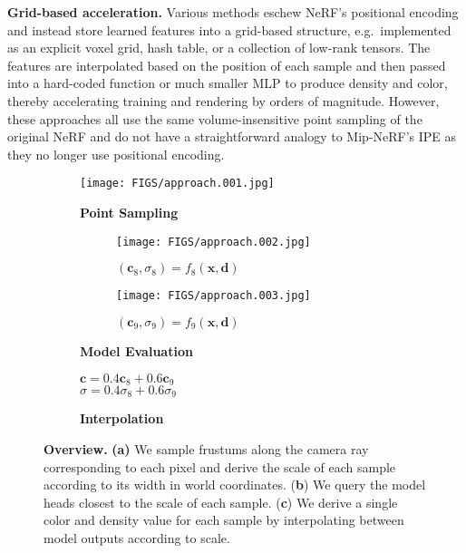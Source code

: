 \documentclass{article}
\begin{document}
\textbf{Grid-based acceleration.} Various methods \cite{yu_and_fridovichkeil2021plenoxels, mueller2022instant, SunSC22, Chen2022ECCV, kplanes_2023} eschew NeRF's positional encoding and instead store learned features into a grid-based structure, e.g.\ implemented as an explicit voxel grid, hash table, or a collection of low-rank tensors. The features are interpolated based on the position of each sample and then passed into a hard-coded function or much smaller MLP to produce density and color, thereby accelerating training and rendering by orders of magnitude. However, these approaches all use the same volume-insensitive point sampling of the original NeRF and do not have a straightforward analogy to Mip-NeRF's IPE as they no longer use positional encoding.

\begin{figure*}[t!]
  \centering
  \begin{subfigure}[ht]{0.55\textwidth}
    \centering
    \texttt{[image: FIGS/approach.001.jpg]}
    \vspace*{0.3mm}
    \caption{\textbf{Point Sampling}}
  \end{subfigure}
  \begin{subfigure}[ht]{0.2\textwidth}
  \vspace*{1.5mm}
    \begin{subfigure}{\textwidth}
      \centering
      \texttt{[image: FIGS/approach.002.jpg]}
    \caption*{$(\mathbf{c}_8, \sigma_8) = f_8(\mathbf{x}, \mathbf{d})$}
    \end{subfigure}
    \begin{subfigure}{\textwidth}
      \centering
      \texttt{[image: FIGS/approach.003.jpg]}
    \caption*{$(\mathbf{c}_9, \sigma_9) = f_9(\mathbf{x}, \mathbf{d})$}
    \end{subfigure}
    \caption{\textbf{Model Evaluation}}
    \label{fig:flat}
  \end{subfigure}
  \hspace*{3mm}
  \begin{subfigure}[ht]{0.2\textwidth}
    \vspace*{12.3mm}
    \centering
    $\mathbf{c} = 0.4\mathbf{c}_8 + 0.6\mathbf{c}_9$ \\
    $\sigma = 0.4\sigma_8 + 0.6\sigma_9$
    \vspace*{12.3mm}
    \caption{\textbf{Interpolation}}
    
  \end{subfigure}
\caption{{\bf Overview.} \textbf{(a)} We sample frustums along the camera ray corresponding to each pixel and derive the scale of each sample according to its width in world coordinates. (\textbf{b}) We query the model heads closest to the scale of each sample. (\textbf{c}) We derive a single color and density value for each sample by interpolating between model outputs according to scale.}
  \label{fig:overview}
\end{figure*}
\end{document}
